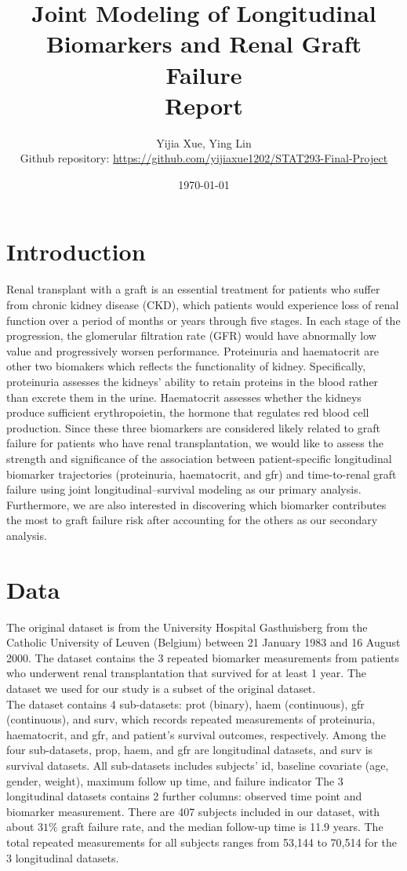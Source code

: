\documentclass[11pt]{article}
\title{Joint Modeling of Longitudinal Biomarkers and Renal Graft Failure\\ Report}
\author{Yijia Xue, Ying Lin\\
\small Github repository: \url{https://github.com/yijiaxue1202/STAT293-Final-Project}}
\date{\today}
\begin{document}
\maketitle
\doublespacing

\section{Introduction}
Renal transplant with a graft is an essential treatment for patients who suffer from chronic kidney disease (CKD), which patients would experience loss of renal function over a period of months or years through five stages. In each stage of the progression, the glomerular filtration rate (GFR) would have abnormally low value and progressively worsen performance. Proteinuria and haematocrit are other two biomakers which reflects the functionality of kidney. Specifically, proteinuria assesses the kidneys' ability to retain proteins in the blood rather than excrete them in the urine. Haematocrit assesses whether the kidneys produce sufficient erythropoietin, the hormone that regulates red blood cell production. Since these three biomarkers are considered likely related to graft failure for patients who have renal transplantation, we would like to assess the strength and significance of the association between patient-specific longitudinal biomarker trajectories (proteinuria, haematocrit, and gfr) and time-to-renal graft failure using joint longitudinal--survival modeling as our primary analysis. Furthermore, we are also interested in discovering which biomarker contributes the most to graft failure risk after accounting for the others as our secondary analysis. 

\section{Data}

The original dataset is from the University Hospital Gasthuisberg from the Catholic University of Leuven (Belgium) between 21 January 1983 and 16 August 2000. The dataset contains the 3 repeated biomarker measurements from patients who underwent renal transplantation that survived for at least 1 year. The dataset we used for our study is a subset of the original dataset.\\

The dataset contains 4 sub-datasets: prot (binary), haem (continuous), gfr (continuous), and surv, which records repeated measurements of proteinuria, haematocrit, and gfr, and patient's survival outcomes, respectively. Among the four sub-datasets, prop, haem, and gfr are longitudinal datasets, and surv is survival datasets. All sub-datasets includes subjects' id, baseline covariate (age, gender, weight), maximum follow up time, and failure indicator The 3 longitudinal datasets contains 2 further columns: observed time point and biomarker measurement. There are 407 subjects included in our dataset, with about $31\%$ graft failure rate, and the median follow-up time is 11.9 years. The total repeated measurements for all subjects ranges from 53,144 to 70,514 for the 3 longitudinal datasets.
\end{document}
